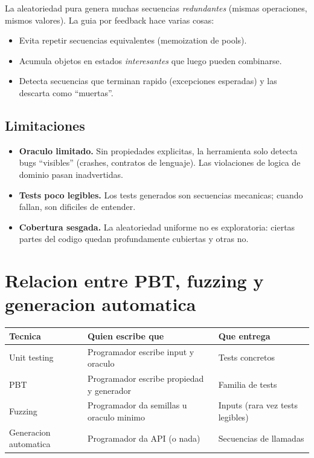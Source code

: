 \documentclass[12pt,a4paper]{article}
\begin{document}
La aleatoriedad pura genera muchas secuencias \emph{redundantes} (mismas operaciones, mismos
valores). La guia por feedback hace varias cosas:

\begin{itemize}
  \item Evita repetir secuencias equivalentes (memoization de pools).
  \item Acumula objetos en estados \emph{interesantes} que luego pueden combinarse.
  \item Detecta secuencias que terminan rapido (excepciones esperadas) y las descarta como
  ``muertas''.
\end{itemize}

\subsection{Limitaciones}

\begin{itemize}
  \item \textbf{Oraculo limitado.} Sin propiedades explicitas, la herramienta solo detecta
  bugs ``visibles'' (crashes, contratos de lenguaje). Las violaciones de logica de dominio
  pasan inadvertidas.
  \item \textbf{Tests poco legibles.} Los tests generados son secuencias mecanicas; cuando
  fallan, son dificiles de entender.
  \item \textbf{Cobertura sesgada.} La aleatoriedad uniforme no es exploratoria: ciertas
  partes del codigo quedan profundamente cubiertas y otras no.
\end{itemize}

\section{Relacion entre PBT, fuzzing y generacion automatica}

\begin{center}
\begin{tabular}{lll}
\toprule
Tecnica & Quien escribe que & Que entrega \\
\midrule
Unit testing & Programador escribe input y oraculo & Tests concretos \\
PBT & Programador escribe propiedad y generador & Familia de tests \\
Fuzzing & Programador da semillas u oraculo minimo & Inputs (rara vez tests legibles) \\
Generacion automatica & Programador da API (o nada) & Secuencias de llamadas \\
\bottomrule
\end{tabular}
\end{center}
\end{document}
